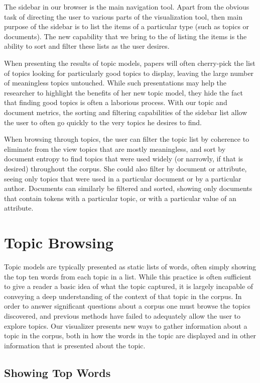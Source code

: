 \documentclass{article}
\begin{document}
The sidebar in our browser is the main navigation tool.  Apart from the obvious
task of directing the user to various parts of the visualization tool, then
main purpose of the sidebar is to list the items of a particular type (such as
topics or documents).  The new capability that we bring to the of listing the
items is the ability to sort and filter these lists as the user desires.

When presenting the results of topic models, papers will often cherry-pick the
list of topics looking for particularly good topics to display, leaving the
large number of meaningless topics untouched.  While such presentations may
help the researcher to highlight the benefits of her new topic model, they hide
the fact that finding good topics is often a laborious process.  With our topic
and document metrics, the sorting and filtering capabilities of the sidebar
list allow the user to often go quickly to the very topics he desires to find.

When browsing through topics, the user can filter the topic list by coherence
to eliminate from the view topics that are mostly meaningless, and sort by
document entropy to find topics that were used widely (or narrowly, if that is
desired) throughout the corpus.  She could also filter by document or
attribute, seeing only topics that were used in a particular document or by a
particular author.  Documents can similarly be filtered and sorted, showing
only documents that contain tokens with a particular topic, or with a
particular value of an attribute.

\section{Topic Browsing}

Topic models are typically presented as static lists of words, often simply
showing the top ten words from each topic in a list.  While this practice is
often sufficient to give a reader a basic idea of what the topic captured, it
is largely incapable of conveying a deep understanding of the context of that
topic in the corpus.  In order to answer significant questions about a corpus
one must browse the topics discovered, and previous methods have failed to
adequately allow the user to explore topics.  Our visualizer presents new ways
to gather information about a topic in the corpus, both in how the words in the
topic are displayed and in other information that is presented about the topic.

\subsection{Showing Top Words}
\end{document}
